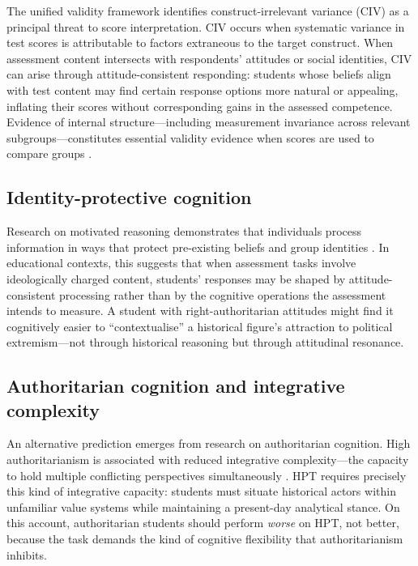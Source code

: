 \documentclass[pdflatex,sn-apa]{sn-jnl}%
\begin{document}
The unified validity framework \citep{Messick1995, AERA2014} identifies construct-irrelevant variance (CIV) as a principal threat to score interpretation. CIV occurs when systematic variance in test scores is attributable to factors extraneous to the target construct. When assessment content intersects with respondents' attitudes or social identities, CIV can arise through attitude-consistent responding: students whose beliefs align with test content may find certain response options more natural or appealing, inflating their scores without corresponding gains in the assessed competence. Evidence of internal structure---including measurement invariance across relevant subgroups---constitutes essential validity evidence when scores are used to compare groups \citep{AERA2014}.

\subsection{Identity-protective cognition}\label{subsec:ipc}

Research on motivated reasoning demonstrates that individuals process information in ways that protect pre-existing beliefs and group identities \citep{Kahan2017, Jost2003}. In educational contexts, this suggests that when assessment tasks involve ideologically charged content, students' responses may be shaped by attitude-consistent processing rather than by the cognitive operations the assessment intends to measure. A student with right-authoritarian attitudes might find it cognitively easier to ``contextualise'' a historical figure's attraction to political extremism---not through historical reasoning but through attitudinal resonance.

\subsection{Authoritarian cognition and integrative complexity}\label{subsec:auth}

An alternative prediction emerges from research on authoritarian cognition. High authoritarianism is associated with reduced integrative complexity---the capacity to hold multiple conflicting perspectives simultaneously \citep{Suedfeld1977, Duckitt2001}. HPT requires precisely this kind of integrative capacity: students must situate historical actors within unfamiliar value systems while maintaining a present-day analytical stance. On this account, authoritarian students should perform \emph{worse} on HPT, not better, because the task demands the kind of cognitive flexibility that authoritarianism inhibits.
\end{document}
